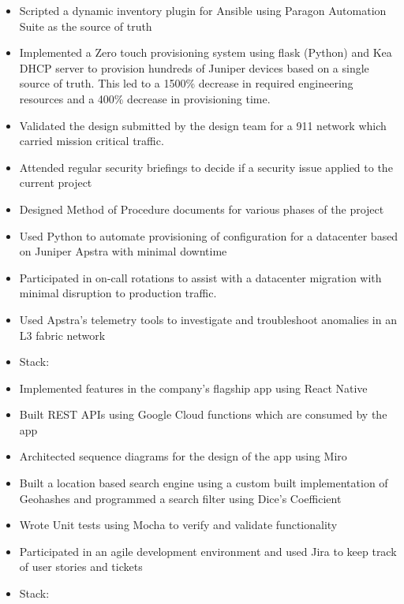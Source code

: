     

\begin{itemize}
    \item Scripted a dynamic inventory plugin for Ansible using Paragon Automation Suite as the source of truth
    \item Implemented a Zero touch provisioning system using flask (Python) and Kea DHCP server to provision hundreds of Juniper devices based on a single source of truth. This led to a 1500\% decrease in required engineering resources and a 400\% decrease in provisioning time.
    \item Validated the design submitted by the design team for a 911 network which carried mission critical traffic.
    \item Attended regular security briefings to decide if a security issue applied to the current project
    \item Designed Method of Procedure documents for various phases of the project 
    \item  Used Python to automate provisioning of configuration for a datacenter based on Juniper Apstra with minimal downtime
    \item Participated in on-call rotations to assist with a datacenter migration with minimal disruption to production traffic.
    \item Used Apstra's telemetry tools to investigate and troubleshoot anomalies in an L3 fabric network
    
    \item Stack:    
\end{itemize}

\divider

\begin{itemize}
    \item Implemented features in the company's flagship app using React Native
    \item Built REST APIs using Google Cloud functions which are consumed by the app
    \item Architected sequence diagrams for the design of the app using Miro
    \item Built a location based search engine using a custom built implementation of Geohashes and programmed a search filter using Dice's Coefficient
    \item Wrote Unit tests using Mocha to verify and validate functionality
    \item Participated in an agile development environment and used Jira to keep track of user stories and tickets
    \item Stack:       
\end{itemize}
\divider

